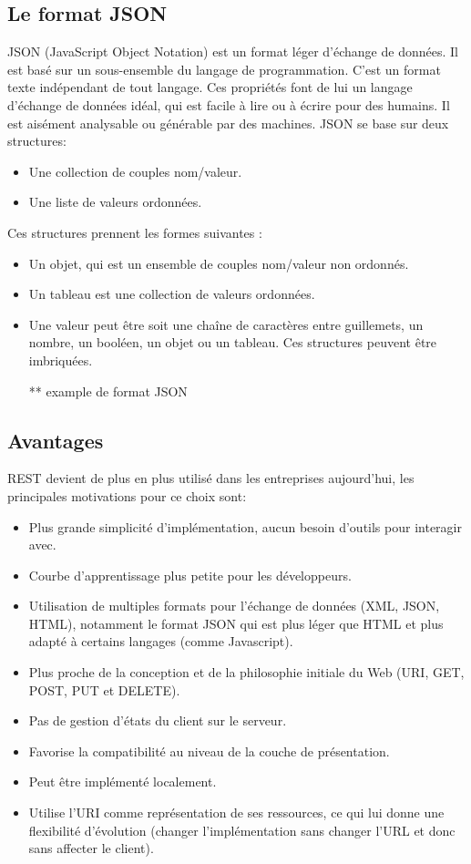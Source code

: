 \subsection{Le format JSON}
JSON (JavaScript Object Notation) est un format léger d'échange de données. Il est basé sur un sous-ensemble du langage de programmation. C’est un format texte indépendant de tout langage.
Ces propriétés font de lui un langage d'échange de données idéal, qui est facile à lire ou à écrire pour des humains. Il est aisément analysable ou générable par des machines. 
JSON se base sur deux structures:
\begin{itemize}
	
	\item Une collection de couples nom/valeur. 
	\item Une liste de valeurs ordonnées. 
\end{itemize}
Ces structures prennent les formes suivantes :
\begin{itemize}
	\item Un objet, qui est un ensemble de couples nom/valeur non ordonnés. 
	\item Un tableau est une collection de valeurs ordonnées. 
	\item Une valeur peut être soit une chaîne de caractères entre guillemets, un nombre, un booléen, un objet ou un tableau. Ces structures peuvent être imbriquées.
	      
	      ** example de format JSON
\end{itemize}

\subsection{Avantages}
REST devient de plus en plus utilisé dans les entreprises aujourd'hui, les principales motivations pour ce choix sont:\cite{refSOAPvsREST}
\begin{itemize}
	\item Plus grande simplicité d'implémentation, aucun besoin d'outils pour interagir avec.
	\item Courbe d'apprentissage plus petite pour les développeurs.
	\item Utilisation de multiples formats pour l'échange de données (XML, JSON, HTML), notamment le format JSON qui est plus léger que HTML et plus adapté à certains langages (comme Javascript).
	\item Plus proche de la conception et de la philosophie initiale du Web (URI, GET, POST, PUT et DELETE).
	\item Pas de gestion d'états du client sur le serveur.
	\item Favorise la compatibilité au niveau de la couche de présentation.
	\item Peut être implémenté localement.
	\item Utilise l'URI comme représentation de ses ressources, ce qui lui donne une flexibilité d'évolution (changer l'implémentation sans changer l'URL et donc sans affecter le client).
\end{itemize}
